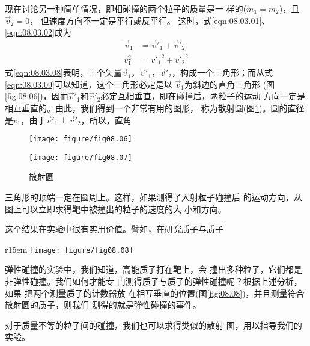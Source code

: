 \documentclass[../outline-of-mechanics.tex]{subfiles}
\begin{document}
现在讨论另一种简单情况，即相碰撞的两个粒子的质量是一
样的($ m _ { 1 } = m _ { 2 } $)，且$ \vec { v } _ { 2 } = 0 $，
但速度方向不一定是平行或反平行。
这时，式\eqref{eqn:08.03.01}、\eqref{eqn:08.03.02}成为
\begin{align}
  \vec { v } _ { 1 } & = \vec { v } ' _ { 1 } + \vec { v } ' _ { 2 } \label{eqn:08.03.08}       \\
  v _ 1 ^ { 2 }      & = { v ' _ { 1 } } ^ { 2 } + { v ' _ { 2 } } ^ { 2 } \label{eqn:08.03.09}
\end{align}
式\eqref{eqn:08.03.08}表明，三个矢量$ \vec { v } _ { 1 } $，$ \vec { v } ' _ { 1 } $，$ \vec { v } ' _ { 2 } $，构成一个三角形；而从式
\eqref{eqn:08.03.09}可以知道，这个三角形必定是以
$ \vec { v } _ { 1 } $为斜边的直角三角形
(图\ref{fig:08.06})，因而$ \vec { v } ' _ { 1 } $和$ \vec { v } ' _ { 2 } $必定互相垂直，即在碰撞后，两粒子的运动
方向一定是相互垂直的。由此，我们得到一个非常有用的图形，
称为散射圆(图\ref{fig:08.07})。圆的直径是$ v _ { 1 } $，由于$ \vec { v } ' _ { 1 } \perp \vec { v } ' _ 2 $，所以，直角
\begin{figure}[h]
  \begin{minipage}[b]{0.5\linewidth}
    \centering
    \texttt{[image: figure/fig08.06]}
    \caption{碰撞速度之间的关系}
    \label{fig:08.06}
  \end{minipage}
  \begin{minipage}[b]{0.5\linewidth}
    \centering
    \texttt{[image: figure/fig08.07]}
    \caption{散射圆}
    \label{fig:08.07}
  \end{minipage}
\end{figure}
三角形的顶端一定在圆周上。这样，如果测得了入射粒子碰撞后
的运动方向，从图上可以立即求得靶中被撞出的粒子的速度的大
小和方向。

这个结果在实验中很有实用价值。譬如，在研究质子与质子
\begin{wrapfigure}[7]{r}{15em}
  \centering
  \texttt{[image: figure/fig08.08]}
  \caption{测量质子-质子弹性散射}
  \label{fig:08.08}
\end{wrapfigure}
弹性碰撞的实验中，我们知道，高能质子打在靶上，会
撞出多种粒子，它们都是非弹性碰撞。我们如何才能专
门测得质子与质子的弹性碰撞呢？根据上述分析，如果
把两个测量质子的计数器放
在相互垂直的位置(图\ref{fig:08.08})，并且测量符合散射圆的质子，则我们
测得的就是弹性碰撞的事件。

对于质量不等的粒子间的碰撞，我们也可以求得类似的散射
图，用以指导我们的实验。
\end{document}
